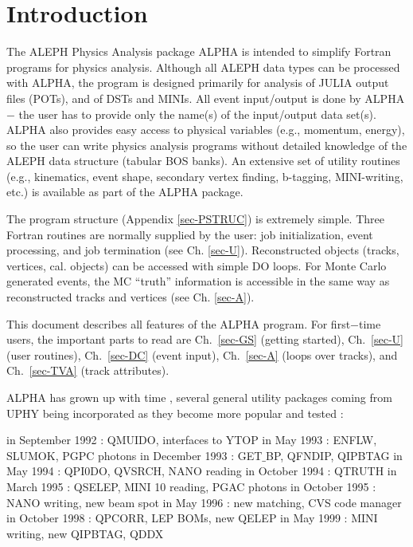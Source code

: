 \chapter{\label{sec-INTRO}Introduction}
\par
The ALEPH Physics Analysis package ALPHA is intended to simplify Fortran
programs for physics analysis.
Although all ALEPH data types can be processed with ALPHA,
the program is designed primarily
for analysis of JULIA output files (POTs), and of  DSTs and MINIs.
All event input/output is done by ALPHA $-$ the user has to provide
only the name(s) of the input/output
data set(s).
ALPHA also provides easy access to physical variables
(e.g., momentum, energy), so the user can write physics analysis programs
without detailed knowledge of
the ALEPH data structure (tabular BOS banks).
An extensive set of utility routines (e.g., kinematics, event shape,
secondary vertex finding, b-tagging, MINI-writing, etc.)
is available as part of the ALPHA package.

\par
The program structure (Appendix
\ref{sec-PSTRUC}) is extremely simple. Three Fortran routines are
normally
supplied by the user: job initialization, event processing, and job
termination (see Ch. \ref{sec-U}).
Reconstructed objects (tracks, vertices,
cal. objects) can be accessed with
simple DO loops. For Monte Carlo generated events, the MC
``truth'' information is accessible
in the same way as reconstructed tracks and vertices (see Ch. \ref{sec-A}).
\par
This document describes all features of the ALPHA program.
For first$-$time users, the important parts to
read are Ch.~\ref{sec-GS} (getting started),
Ch.~\ref{sec-U} (user routines), Ch.~\ref{sec-DC} (event input),
Ch.~\ref{sec-A} (loops over tracks), and Ch.~\ref{sec-TVA}
(track attributes).
\par
ALPHA has grown up with time , several general utility packages coming from UPHY
being incorporated as they become more popular and tested :
 
\begin{indentlist}{ 3.50cm}{ 3.75cm}
 in September 1992 : QMUIDO, interfaces to YTOP
 in May       1993 : ENFLW, SLUMOK, PGPC photons
 in December  1993 : GET$\_$BP, QFNDIP, QIPBTAG
 in May       1994 : QPI0DO, QVSRCH, NANO reading 
 in October   1994 : QTRUTH
 in March     1995 : QSELEP, MINI 10 reading, PGAC photons
 in October   1995 : NANO writing, new beam spot
 in May       1996 : new matching, CVS code manager 
 in October   1998 : QPCORR, LEP BOMs, new QELEP          
 in May       1999 : MINI writing, new QIPBTAG, QDDX     
 
\end{indentlist}
 
 
 
